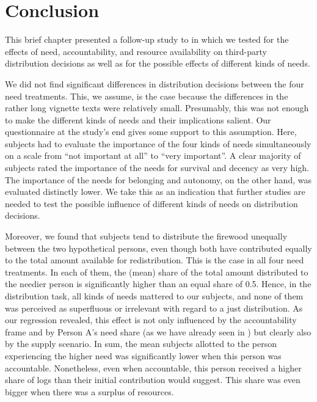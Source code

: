 \documentclass[egregdoesnotlikesansseriftitles]{scrartcl}
\begin{document}
\section{Conclusion}\label{sec:conclusion}
This brief chapter presented a follow-up study to \cite{bauer_need_2022} in which we tested for the effects of need, accountability, and resource availability on third-party distribution decisions as well as for the possible effects of different kinds of needs.

We did not find significant differences in distribution decisions between the four need treatments.
This, we assume, is the case because the differences in the rather long vignette texts were relatively small.
Presumably, this was not enough to make the different kinds of needs and their implications salient.
Our questionnaire at the study's end gives some support to this assumption.
Here, subjects had to evaluate the importance of the four kinds of needs simultaneously on a scale from ``not important at all'' to ``very important''.
A clear majority of subjects rated the importance of the needs for survival and decency as very high.
The importance of the needs for belonging and autonomy, on the other hand, was evaluated distinctly lower.
We take this as an indication that further studies are needed to test the possible influence of different kinds of needs on distribution decisions.

Moreover, we found that subjects tend to distribute the firewood unequally between the two hypothetical persons, even though both have contributed equally to the total amount available for redistribution.
This is the case in all four need treatments.
In each of them, the (mean) share of the total amount distributed to the needier person is significantly higher than an equal share of 0.5.
Hence, in the distribution task, all kinds of needs mattered to our subjects, and none of them was perceived as superfluous or irrelevant with regard to a just distribution.
As our regression revealed, this effect is not only influenced by the accountability frame and by Person A's need share (as we have already seen in \citealt{bauer_need_2022}) but clearly also by the supply scenario.
In sum, the mean subjects allotted to the person experiencing the higher need was significantly lower when this person was accountable.
Nonetheless, even when accountable, this person received a higher share of logs than their initial contribution would suggest.
This share was even bigger when there was a surplus of resources.
\end{document}
